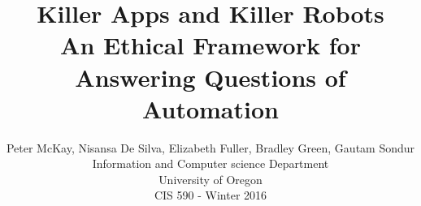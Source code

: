 \documentclass[12pt,twocolumn]{IEEEtran11}
\begin{document}


\title{%
  Killer Apps and Killer Robots \\
\Large An Ethical Framework for Answering Questions of Automation
}
\author{
Peter McKay, Nisansa De Silva, Elizabeth Fuller, Bradley Green, 
Gautam Sondur\\
Information and Computer science Department\\
University of Oregon\\
CIS 590 - Winter 2016\\
}
\maketitle










\end{document}
